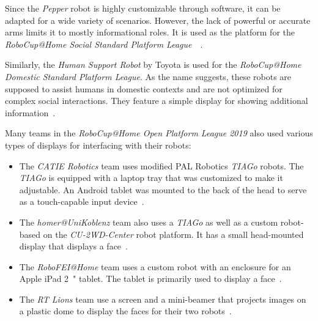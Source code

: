 Since the \textit{Pepper} robot is highly customizable through software, it can be adapted for a wide
variety of scenarios. However, the lack of powerful or accurate arms limits it to mostly informational
roles. It is used as the platform for the \textit{RoboCup@Home Social Standard Platform League}~\
\cite{pepper-robot}.

Similarly, the \textit{Human Support Robot} by Toyota is used for the \textit{RoboCup@Home Domestic
Standard Platform League}. As the name suggests, these robots are supposed to assist humans in
domestic contexts and are not optimized for complex social interactions. They feature a simple
display for showing additional information~\cite{human-support-robot}.

Many teams in the \textit{RoboCup@Home Open Platform League 2019} also used various types of displays
for interfacing with their robots:

\begin{itemize}
    \item The \textit{CATIE Robotics} team uses modified PAL Robotics \textit{TIAGo} robots. The
          \textit{TIAGo} is equipped with a laptop tray that was customized to make it adjustable.
          An Android tablet was mounted to the back of the head to serve as a touch-capable input
          device~\cite{catie-robotics-tdp}.
    \item The \textit{homer@UniKoblenz} team also uses a \textit{TIAGo} as well as a custom robot-based
          on the \textit{CU-2WD-Center} robot platform. It has a small head-mounted display that displays
          a face~\cite{homer-at-uni-koblenz-tdp}.
    \item The \textit{RoboFEI@Home} team uses a custom robot with an enclosure for an Apple iPad \SI{2}{"}
          tablet. The tablet is primarily used to display a face~\cite{robo-fei-at-home-tdp}.
    \item The \textit{RT Lions} team use a screen and a mini-beamer that projects images on a plastic
          dome to display the faces for their two robots~\cite{rt-lions-tdp}.
\end{itemize}
